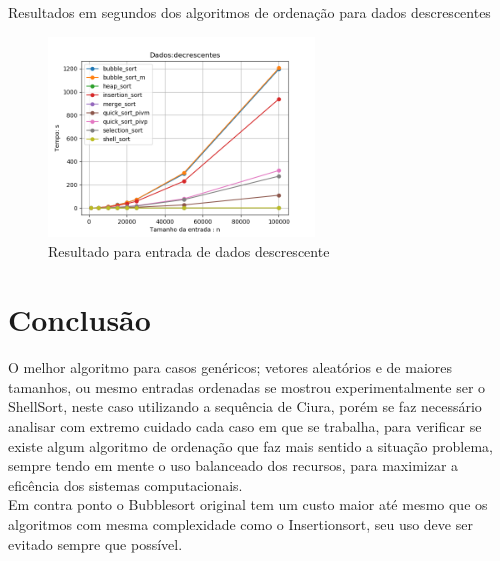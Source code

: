\documentclass[10pt,a4paper]{article}
\begin{document}
\begin{center}
\begin{table}[H]
            \caption{Resultados em segundos dos algoritmos de ordenação para dados descrescentes}
        \end{table}
        \begin{figure}[H]
            \centering
            \includegraphics[width=0.63\textwidth]{Resultados/Graficos/decrescentes.png}
            \caption{Resultado para entrada de dados descrescente}
        \end{figure}
    \end{center}

\newpage
\section{Conclusão}
    \indent O melhor algoritmo para casos genéricos; vetores aleatórios e de maiores tamanhos, ou mesmo entradas ordenadas se mostrou experimentalmente ser o ShellSort, neste caso utilizando a sequência de Ciura, porém se faz necessário analisar com extremo cuidado cada caso em que se trabalha, para verificar se existe algum algoritmo de ordenação que faz mais sentido a situação problema, sempre tendo em mente o uso balanceado dos recursos, para maximizar a eficência dos sistemas computacionais. \\
    \indent Em contra ponto o Bubblesort original tem um custo maior até mesmo que os algoritmos com mesma complexidade como o Insertionsort, seu uso deve ser evitado sempre que possível.
\end{document}
